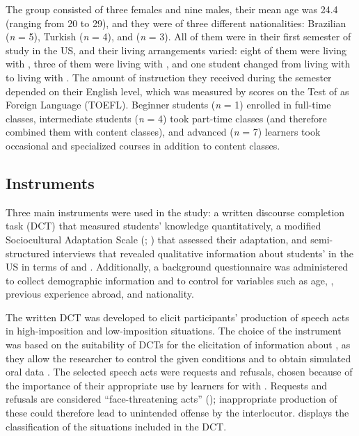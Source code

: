 \documentclass[output=paper]{langsci/langscibook}
\begin{document}
The group consisted of three females and nine males, their mean age was 24.4 (ranging from 20 to 29), and they were of three different nationalities: Brazilian (\textit{n} = 5), Turkish (\textit{n} = 4), and  (\textit{n} = 3). All of them were in their first semester of study in the US, and their living arrangements varied: eight of them were living with , three of them were living with , and one student changed from living with  to living with . The amount of  instruction they received during the semester depended on their English  level, which was measured by scores on the Test of  as Foreign Language (TOEFL). Beginner students (\textit{n} = 1) enrolled in full-time  classes, intermediate students (\textit{n} = 4) took part-time classes (and therefore combined them with content classes), and advanced (\textit{n} = 7) learners took occasional and specialized  courses in addition to content classes.


\subsection{Instruments} 
Three main instruments were used in the study: a written discourse completion task (DCT) that measured students’  knowledge quantitatively, a modified Sociocultural Adaptation Scale (; \citealt{WardKennedy1999}) that assessed their  adaptation, and semi-structured interviews that revealed qualitative information about students’  in the US in terms of  and . Additionally, a background questionnaire was administered to collect demographic information and to control for variables such as age, , previous experience abroad, and nationality. 

The written DCT was developed to elicit participants’ production of speech acts in high-imposition and low-imposition situations. The choice of the instrument was based on the suitability of DCTs for the elicitation of information about , as they allow the researcher to control the given conditions and to obtain simulated oral data \citep{Félix-BrasdeferHasler-Baker2017}. The selected speech acts were requests and refusals, chosen because of the importance of their appropriate use by  learners for  with . Requests and refusals are considered “face-threatening acts” (\citealt{BrownLevinson1987}); inappropriate production of these could therefore lead to unintended offense by the interlocutor.  displays the classification of the  situations included in the DCT. 
\end{document}
